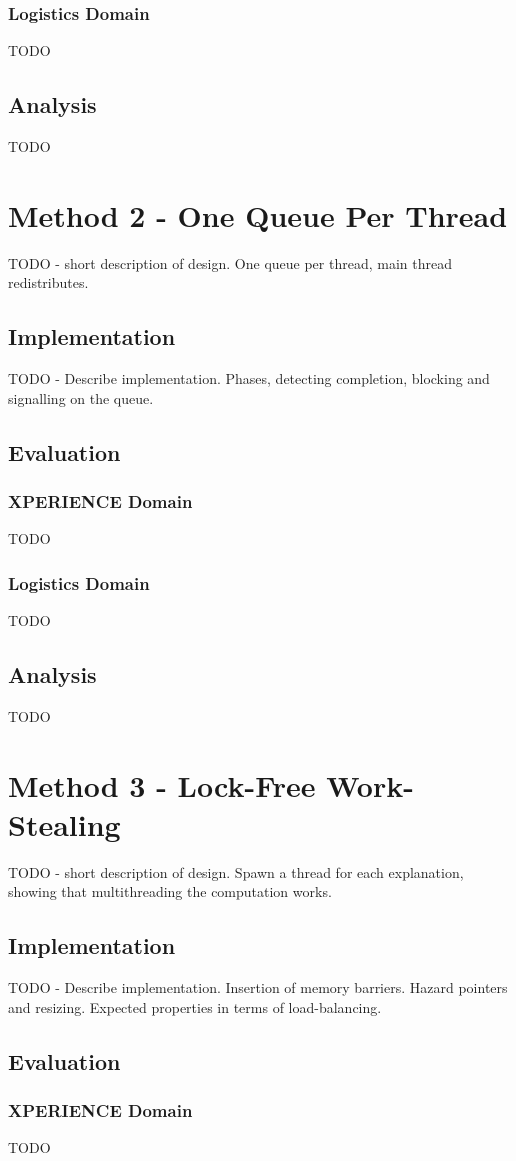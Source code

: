 \documentclass[12pt,twoside,abbrevs,msc,ai,notimes,logo,sansheadings]{infthesis}
\begin{document}
  \subsection{Logistics Domain}
  TODO
  \section{Analysis}
  TODO
  \chapter {Method 2 - One Queue Per Thread}
  TODO - short description of design. One queue per thread, main thread redistributes.
  \section {Implementation}
  TODO - Describe implementation. Phases, detecting completion, blocking and signalling on the queue.
  \section{Evaluation}
  \subsection{XPERIENCE Domain}
  TODO
  \subsection{Logistics Domain}
  TODO
  \section{Analysis}
  TODO
  \chapter {Method 3 - Lock-Free Work-Stealing}
  TODO - short description of design. Spawn a thread for each explanation, showing that multithreading the computation works.
  \section {Implementation}
  TODO - Describe implementation. Insertion of memory barriers. Hazard pointers and resizing. Expected properties in terms of load-balancing.
  \section{Evaluation}
  \subsection{XPERIENCE Domain}
  TODO
\end{document}
